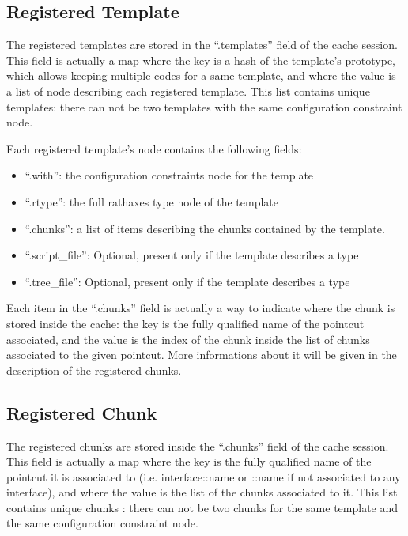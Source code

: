 \documentclass[american]{rtxreport}
\begin{document}
\subsection{Registered Template}

The registered templates are stored in the ``.templates'' field of the cache
session. This field is actually a map where the key is a hash of the template's
prototype, which allows keeping multiple codes for a same template, and where
the value is a list of node describing each registered template. This list
contains unique templates: there can not be two templates with the same
configuration constraint node.

Each registered template's node contains the following fields:
\begin{itemize}
    \item ``.with'': the configuration constraints node for the template
    \item ``.rtype'': the full rathaxes type node of the template
    \item ``.chunks'': a list of items describing the chunks contained by the
            template.
    \item ``.script\_file'': Optional, present only if the template describes
            a type
    \item ``.tree\_file'': Optional, present only if the template describes
            a type
\end{itemize}

Each item in the ``.chunks'' field is actually a way to indicate where the
chunk is stored inside the cache: the key is the fully qualified name of the
pointcut associated, and the value is the index of the chunk inside the list of
chunks associated to the given pointcut. More informations about it will be
given in the description of the registered chunks.


\subsection{Registered Chunk}

The registered chunks are stored inside the ``.chunks'' field of the cache
session. This field is actually a map where the key is the fully qualified name
of the pointcut it is associated to (i.e. interface::name or ::name if not
associated to any interface), and where the value is the list of the chunks
associated to it. This list contains unique chunks : there can not be two
chunks for the same template and the same configuration constraint node.
\end{document}
